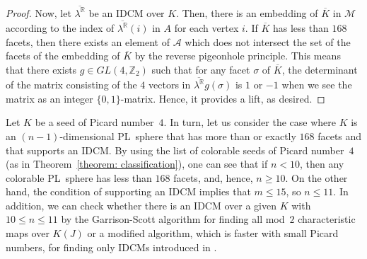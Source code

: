\documentclass[11pt]{amsart}
\theoremstyle{plain}
\numberwithin{equation}{section}
\theoremstyle{definition}
\newcommand{\R}{\mathbb{R}}
\newcommand{\Z}{\mathbb{Z}}
\newcommand{\cM}{\mathcal{M}}
\newcommand{\cA}{\mathcal{A}}
\begin{document}
\begin{proof}
Now, let $\overline{\lambda^\R}$ be an IDCM over $K$.
    Then, there is an embedding of $\overline{K}$ in $\cM$ according to the index of $\overline{\lambda^\R}(i)$ in $A$ for each vertex $i$.
    If $\overline{K}$ has less than $168$ facets, then there exists an element of $\cA$ which does not intersect the set of the facets of the embedding of $\overline{K}$ by the reverse pigeonhole principle.
    This means that there exists $g \in GL(4, \Z_2)$ such that for any facet $\sigma$ of $\overline{K}$, the determinant of the matrix consisting of the $4$ vectors in $\overline{\lambda^\R} g(\sigma)$ is $1$ or $-1$ when we see the matrix as an integer $\{0, 1\}$-matrix.
    Hence, it provides a lift, as desired.
\end{proof}

Let $K$ be a seed of Picard number~$4$.
In turn, let us consider the case where $K$ is an $(n-1)$-dimensional PL~sphere that has more than or exactly $168$ facets and that supports an IDCM.
By using the list of colorable seeds of Picard number~$4$ (as in Theorem~\ref{theorem: classification}), one can see that if $n<10$, then any colorable PL~sphere has less than $168$ facets, and, hence, $n \geq 10$.
On the other hand, the condition of supporting an IDCM implies that $m \leq 15$, so $n\leq 11$.
In addition, we can check whether there is an IDCM over a given $K$ with $10 \leq n \leq 11$ by the Garrison-Scott algorithm \cite{Garrison-Scott2003} for finding all mod~$2$ characteristic maps over $K(J)$ or a modified algorithm, which is faster with small Picard numbers, for finding only IDCMs introduced in \cite{ChoiVal2021-puzzlealgo}.
\end{document}
